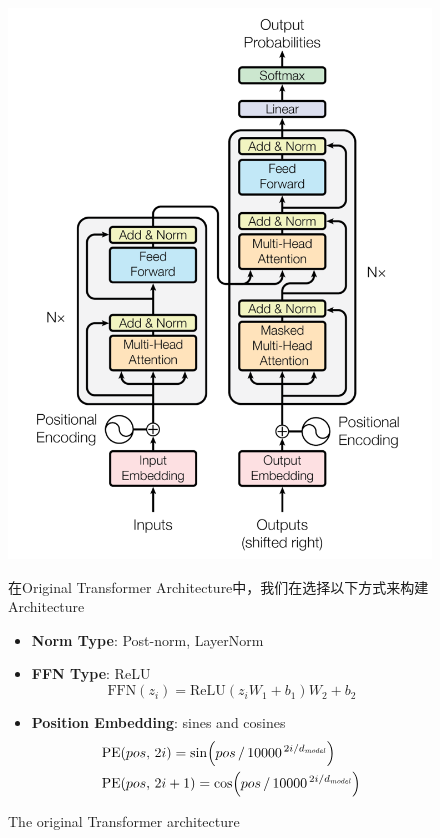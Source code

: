 \begin{figure}[htbp]
  \centering
  \begin{minipage}{0.45\linewidth}
    \includegraphics[width=\linewidth]{figs/lec3/lec3.01.png}
    \caption{The original Transformer architecture}
  \end{minipage}
  \hfill
  \begin{minipage}{0.5\linewidth}
    \small
    在Original Transformer Architecture中，我们在选择以下方式来构建Architecture
    \begin{itemize}
    \item \textbf{Norm Type}: Post-norm, LayerNorm
    \item \textbf{FFN Type}: ReLU \\
        \[
        \text{FFN}(z_i) = \text{ReLU}(z_i W_1 + b_1) W_2 + b_2
        \]
    \item \textbf{Position Embedding}: sines and cosines \\
    \begin{align*}
     &\mathrm{PE}(pos,\, 2i)   = \sin \Bigl( pos \,/\, 10000^{\,2i / d_{\mathit{model}}} \Bigr)\\
     &\mathrm{PE}(pos,\, 2i+1) = \cos \Bigl( pos \,/\, 10000^{\,2i / d_{\mathit{model}}} \Bigr)
    \end{align*}
    

\end{itemize}
\end{minipage}
\end{figure}
